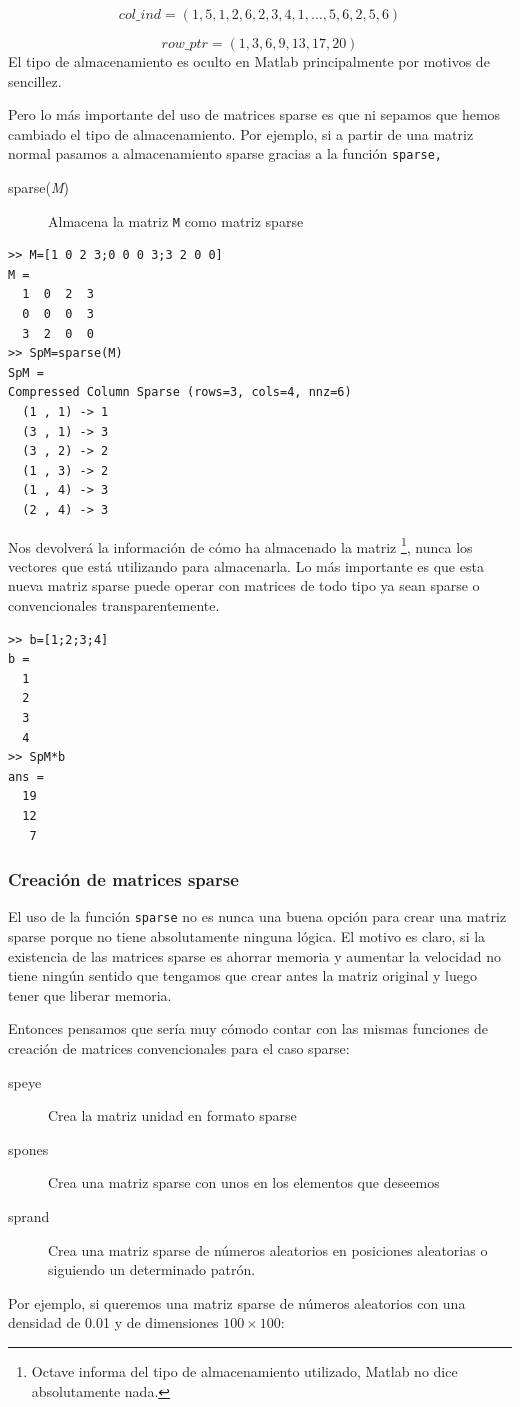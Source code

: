 $$col\_ ind=(1,5,1,2,6,2,3,4,1,\ldots,5,6,2,5,6)$$

$$row\_ ptr=(1,3,6,9,13,17,20)$$
El tipo de almacenamiento es oculto en Matlab principalmente por motivos
de sencillez.

Pero lo más importante del uso de matrices sparse es que ni sepamos
que hemos cambiado el tipo de almacenamiento. Por ejemplo, si a partir
de una matriz normal pasamos a almacenamiento sparse gracias a la
función \texttt{sparse,}

\begin{description}
\item [sparse(\emph{M})]Almacena la matriz \texttt{M} como
matriz sparse
\end{description}
  \begin{verbatim}
>> M=[1 0 2 3;0 0 0 3;3 2 0 0]
M =
  1  0  2  3
  0  0  0  3
  3  2  0  0
>> SpM=sparse(M)
SpM =
Compressed Column Sparse (rows=3, cols=4, nnz=6)
  (1 , 1) -> 1
  (3 , 1) -> 3
  (3 , 2) -> 2
  (1 , 3) -> 2
  (1 , 4) -> 3
  (2 , 4) -> 3
 \end{verbatim}
Nos devolverá la información de cómo ha almacenado la matriz%
\footnote{Octave informa del tipo de almacenamiento utilizado, Matlab no dice
absolutamente nada.%
}, nunca los vectores que está utilizando para almacenarla. Lo más
importante es que esta nueva matriz sparse puede operar con matrices
de todo tipo ya sean sparse o convencionales transparentemente.

  \begin{verbatim}
>> b=[1;2;3;4]
b =
  1
  2
  3
  4
>> SpM*b
ans =
  19
  12
   7
 \end{verbatim}

\subsubsection{\label{sub:Creaci=F3n-de-matrices}Creación de matrices sparse}

El uso de la función \texttt{sparse} no es nunca una buena opción
para crear una matriz sparse porque no tiene absolutamente ninguna
lógica. El motivo es claro, si la existencia de las matrices sparse
es ahorrar memoria y aumentar la velocidad no tiene ningún sentido
que tengamos que crear antes la matriz original y luego tener que
liberar memoria.

Entonces pensamos que sería muy cómodo contar con las mismas funciones
de creación de matrices convencionales para el caso sparse:

\begin{description}
\item [speye]Crea la matriz unidad en formato sparse
\item [spones]Crea una matriz sparse con unos en los elementos
que deseemos
\item [sprand]Crea una matriz sparse de números aleatorios
en posiciones aleatorias o siguiendo un determinado patrón.
\end{description}
Por ejemplo, si queremos una matriz sparse de números aleatorios con
una densidad de 0.01 y de dimensiones $100\times100$:

